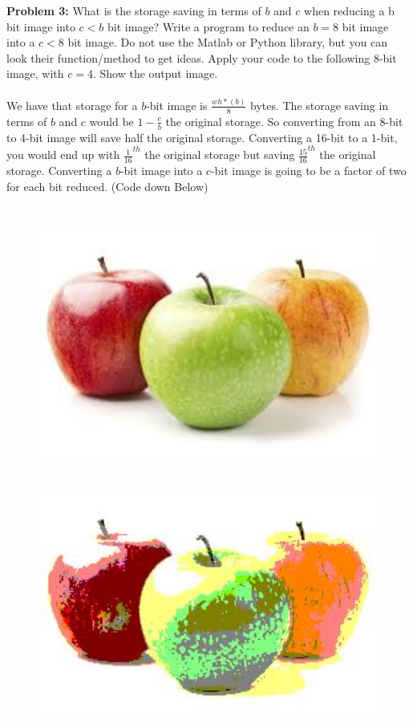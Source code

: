 \documentclass[11pt]{article}
\newenvironment{problem}[1]{\textbf{Problem #1: }}{\newpage}
\begin{document}
	\begin{problem}{3}
		What is the storage saving in terms of $b$ and $c$ when reducing a b bit image into $c < b$ bit image? Write a program to reduce an $b=8$ bit image into a $c<8$ bit image. Do not use the Matlab or Python library, but you can look their function/method to get ideas. Apply your code to the following 8-bit image, with $c=4$.  Show the output image. 
		\\ \\
		We have that storage for a $b$-bit image is $\frac{wh * (b)}{8}$ bytes. The storage saving in terms of $b$ and $c$ would be $1 - \frac{c}{b}$ the original storage.  So converting from an 8-bit to 4-bit image will save half the original storage. Converting a 16-bit to a 1-bit, you would end up with $\frac{1}{16}^{th}$ the original storage but saving $\frac{15}{16}^{th}$ the original storage. Converting a $b$-bit image into a $c$-bit image is going to be a factor of two for each bit reduced. (Code down Below)
		\begin{figure}[h!]
			 \\
			\includegraphics[width = 15cm, height = 8cm]{../Photos/Apples8Bit.jpg}
			\\
			 \\
			\includegraphics[width = 15cm, height = 8cm]{../Photos/Apples4Bit.jpg}
		\end{figure}
	\end{problem}
	
\end{document}
